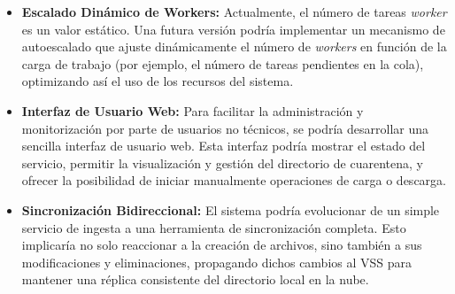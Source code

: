 \begin{itemize}
    \item \textbf{Escalado Dinámico de Workers:} Actualmente, el número de tareas \textit{worker} es un valor estático. Una futura versión podría implementar un mecanismo de autoescalado que ajuste dinámicamente el número de \textit{workers} en función de la carga de trabajo (por ejemplo, el número de tareas pendientes en la cola), optimizando así el uso de los recursos del sistema.

    \item \textbf{Interfaz de Usuario Web:} Para facilitar la administración y monitorización por parte de usuarios no técnicos, se podría desarrollar una sencilla interfaz de usuario web. Esta interfaz podría mostrar el estado del servicio, permitir la visualización y gestión del directorio de cuarentena, y ofrecer la posibilidad de iniciar manualmente operaciones de carga o descarga.
    
    \item \textbf{Sincronización Bidireccional:} El sistema podría evolucionar de un simple servicio de ingesta a una herramienta de sincronización completa. Esto implicaría no solo reaccionar a la creación de archivos, sino también a sus modificaciones y eliminaciones, propagando dichos cambios al VSS para mantener una réplica consistente del directorio local en la nube.
\end{itemize}

